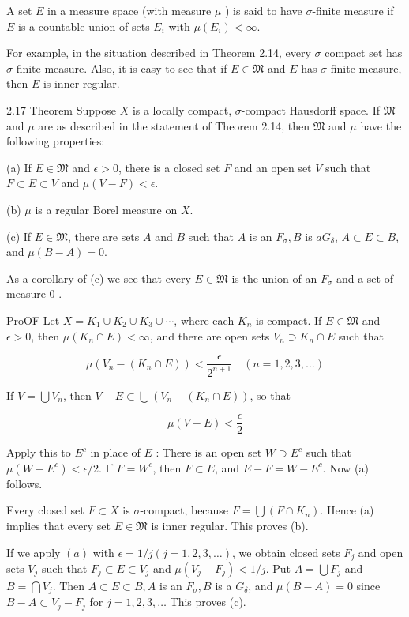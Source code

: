 \documentclass[10pt]{article}
\begin{document}
A set $E$ in a measure space (with measure $\mu$ ) is said to have $\sigma$-finite measure if $E$ is a countable union of sets $E_{i}$ with $\mu\left(E_{i}\right)<\infty$.

For example, in the situation described in Theorem 2.14, every $\sigma$ compact set has $\sigma$-finite measure. Also, it is easy to see that if $E \in \mathfrak{M}$ and $E$ has $\sigma$-finite measure, then $E$ is inner regular.

2.17 Theorem Suppose $X$ is a locally compact, $\sigma$-compact Hausdorff space. If $\mathfrak{M}$ and $\mu$ are as described in the statement of Theorem 2.14, then $\mathfrak{M}$ and $\mu$ have the following properties:

(a) If $E \in \mathfrak{M}$ and $\epsilon>0$, there is a closed set $F$ and an open set $V$ such that $F \subset E \subset V$ and $\mu(V-F)<\epsilon$.

(b) $\mu$ is a regular Borel measure on $X$.

(c) If $E \in \mathfrak{M}$, there are sets $A$ and $B$ such that $A$ is an $F_{\sigma}, B$ is $a G_{\delta}$, $A \subset E \subset B$, and $\mu(B-A)=0$.

As a corollary of (c) we see that every $E \in \mathfrak{M}$ is the union of an $F_{\sigma}$ and a set of measure 0 .

ProOF Let $X=K_{1} \cup K_{2} \cup K_{3} \cup \cdots$, where each $K_{n}$ is compact. If $E \in \mathfrak{M}$ and $\epsilon>0$, then $\mu\left(K_{n} \cap E\right)<\infty$, and there are open sets $V_{n} \supset K_{n} \cap E$ such that

$$
\mu\left(V_{n}-\left(K_{n} \cap E\right)\right)<\frac{\epsilon}{2^{n+1}} \quad(n=1,2,3, \ldots)
$$

If $V=\bigcup V_{n}$, then $V-E \subset \bigcup\left(V_{n}-\left(K_{n} \cap E\right)\right)$, so that

$$
\mu(V-E)<\frac{\epsilon}{2}
$$

Apply this to $E^{c}$ in place of $E$ : There is an open set $W \supset E^{c}$ such that $\mu\left(W-E^{c}\right)<\epsilon / 2$. If $F=W^{c}$, then $F \subset E$, and $E-F=W-E^{c}$. Now (a) follows.

Every closed set $F \subset X$ is $\sigma$-compact, because $F=\bigcup\left(F \cap K_{n}\right)$. Hence (a) implies that every set $E \in \mathfrak{M}$ is inner regular. This proves (b).

If we apply $(a)$ with $\epsilon=1 / j(j=1,2,3, \ldots)$, we obtain closed sets $F_{j}$ and open sets $V_{j}$ such that $F_{j} \subset E \subset V_{j}$ and $\mu\left(V_{j}-F_{j}\right)<1 / j$. Put $A=\bigcup F_{j}$ and $B=\bigcap V_{j}$. Then $A \subset E \subset B, A$ is an $F_{\sigma}, B$ is a $G_{\delta}$, and $\mu(B-A)=0$ since $B-A \subset V_{j}-F_{j}$ for $j=1,2,3, \ldots$ This proves (c).
\end{document}
